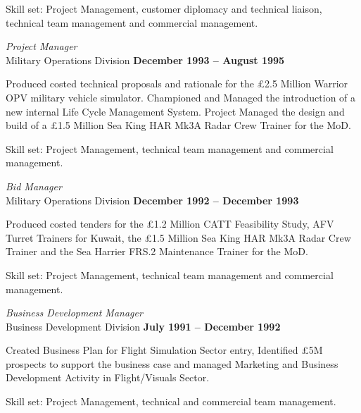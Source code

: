 \documentclass[10pt]{article}
\newenvironment{outerlist}[1][\enskip\textbullet]%
        {\begin{itemize}[#1]}{\end{itemize}%
         \vspace{-.6\baselineskip}}
\newenvironment{innerlist}[1][\enskip\textbullet]%
        {\begin{compactitem}[#1]}{\end{compactitem}}
\begin{document}
\begin{outerlist}
\begin{innerlist}
\item Skill set: Project Management, customer diplomacy and technical liaison, technical team management and commercial management.
\end{innerlist}

\item[] \textit{Project Manager}\\Military Operations Division%
        \hfill \textbf{December 1993 -- August 1995}
\begin{innerlist}
\item Produced costed technical proposals and rationale for the \pounds2.5 Million Warrior OPV military vehicle simulator. Championed and Managed the introduction of a new internal Life Cycle Management System. Project Managed the design and build of a \pounds1.5 Million Sea King HAR Mk3A Radar Crew Trainer for the MoD.

\item Skill set: Project Management, technical team management and commercial management.
\end{innerlist}

\item[] \textit{Bid Manager}\\Military Operations Division%
        \hfill \textbf{December 1992 -- December 1993}
\begin{innerlist}
\item Produced costed tenders for the \pounds1.2 Million CATT Feasibility Study, AFV Turret Trainers for Kuwait, the \pounds 1.5 Million Sea King HAR Mk3A Radar Crew Trainer and the Sea Harrier FRS.2 Maintenance Trainer for the MoD.

\item Skill set: Project Management, technical team management and commercial management.

\end{innerlist}

\item[] \textit{Business Development Manager}\\Business Development Division%
        \hfill \textbf{July 1991 -- December 1992}
\begin{innerlist}
\item Created Business Plan for Flight Simulation Sector entry, Identified \pounds5M prospects to support the business case and managed Marketing and Business Development Activity in Flight/Visuals Sector.

\item Skill set: Project Management, technical and commercial team management.
\end{innerlist}

\end{outerlist}
\end{document}
